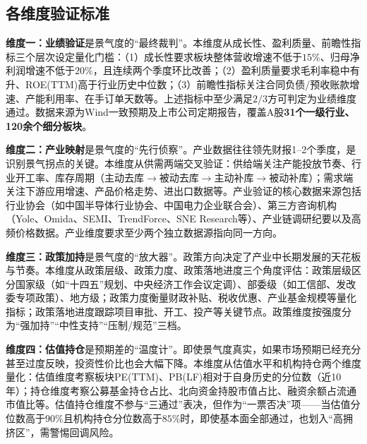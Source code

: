 \subsection{各维度验证标准}

\textbf{维度一：业绩验证}是景气度的“最终裁判”。本维度从成长性、盈利质量、前瞻性指标三个层次设定量化门槛：（1）成长性要求板块整体营收增速不低于\(15\%\)、归母净利润增速不低于\(20\%\)，且连续两个季度环比改善；（2）盈利质量要求毛利率稳中有升、ROE(TTM)高于行业历史中位数；（3）前瞻性指标关注合同负债/预收账款增速、产能利用率、在手订单天数等。上述指标中至少满足$2/3$方可判定为业绩维度通过。数据来源为Wind一致预期及上市公司定期报告，覆盖A股\textbf{31个一级行业、120余个细分板块}。

\textbf{维度二：产业映射}是景气度的“先行侦察”。产业数据往往领先财报1--2个季度，是识别景气拐点的关键。本维度从供需两端交叉验证：供给端关注产能投放节奏、行业开工率、库存周期（主动去库$\rightarrow$被动去库$\rightarrow$主动补库$\rightarrow$被动补库）；需求端关注下游应用增速、产品价格走势、进出口数据等。产业验证的核心数据来源包括行业协会（如中国半导体行业协会、中国电力企业联合会）、第三方咨询机构（Yole、Omida、SEMI、TrendForce、SNE Research等）、产业链调研纪要以及高频价格数据。产业维度要求至少两个独立数据源指向同一方向。

\textbf{维度三：政策加持}是景气度的“放大器”。政策方向决定了产业中长期发展的天花板与节奏。本维度从政策层级、政策力度、政策落地进度三个角度评估：政策层级区分国家级（如“十四五”规划、中央经济工作会议定调）、部委级（如工信部、发改委专项政策）、地方级；政策力度衡量财政补贴、税收优惠、产业基金规模等量化指标；政策落地进度跟踪项目审批、开工、投产等关键节点。政策维度按强度分为“强加持”“中性支持”“压制/规范”三档。

\textbf{维度四：估值持仓}是预期差的“温度计”。即使景气度真实，如果市场预期已经充分甚至过度反映，投资性价比也会大幅下降。本维度从估值水平和机构持仓两个维度量化：估值维度考察板块PE(TTM)、PB(LF)相对于自身历史的分位数（近10年）；持仓维度考察公募基金持仓占比、北向资金持股市值占比、融资余额占流通市值比等。估值持仓维度不参与“三通过”表决，但作为“一票否决”项——当估值分位数高于\(90\%\)且机构持仓分位数高于\(85\%\)时，即使基本面全部通过，也划入“高拥挤区”，需警惕回调风险。

